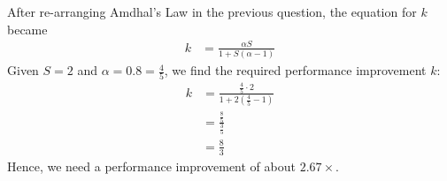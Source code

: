 \documentclass[12pt]{article}
\newenvironment{sol}[1][Solution]{\begin{trivlist}
		\item[\hskip \labelsep {\bfseries #1:}]}{\end{trivlist}}
\begin{document}
\begin{sol}
	After re-arranging Amdhal's Law in the previous question, the equation
	for $k$ became
	\begin{align*}
		k&=\frac{\alpha S}{1+S(\alpha -1)}
	\end{align*}
	Given $S=2$ and $\alpha=0.8=\frac{4}{5}$, we find the required
	performance improvement $k$:
	\begin{align*}
		k&=\frac{\frac{4}{5}\cdot 2}{1 + 2\left(\frac{4}{5}-1\right)}\\
		&=\frac{\frac{8}{5}}{\frac{3}{5}}\\
		&=\frac{8}{3}
	\end{align*}
	Hence, we need a performance improvement of about $2.67\times$.
\end{sol}
\end{document}
